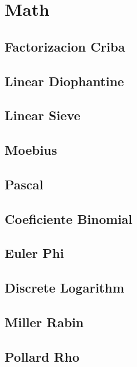 \section{Math}
\subsection{	Factorizacion Criba}
\raggedbottom
\hrulefill
\subsection{	Linear Diophantine}
\raggedbottom
\hrulefill
\subsection{	Linear Sieve}
\raggedbottom
\hrulefill
\subsection{	Moebius}
\raggedbottom
\hrulefill
\subsection{	Pascal}
\raggedbottom
\hrulefill
\subsection{	Coeficiente Binomial}
\raggedbottom
\hrulefill
\subsection{	Euler Phi}
\raggedbottom
\hrulefill
\subsection{	Discrete Logarithm}
\raggedbottom
\hrulefill
\subsection{	Miller Rabin}
\raggedbottom
\hrulefill
\subsection{	Pollard Rho}
\raggedbottom
\hrulefill
